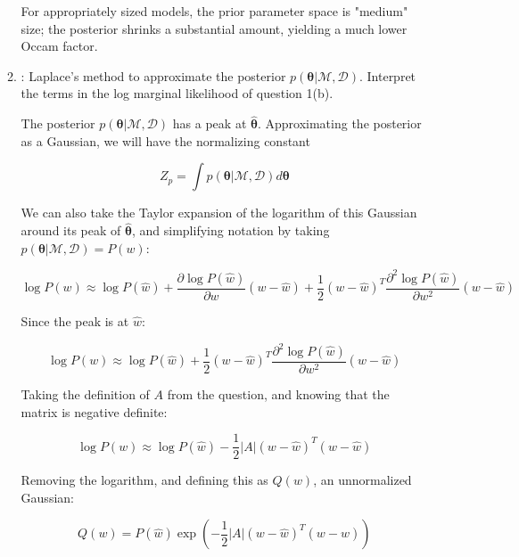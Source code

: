 \documentclass[11pt]{article}
\newcommand{\mbf}[1]{{\boldsymbol{\mathbf{#1}}}}
\renewcommand{\bm}{\mbf}
\begin{document}
\begin{enumerate}
\begin{enumerate}[label=(\alph*)]
            For appropriately sized models, the prior parameter space is "medium" size; the posterior shrinks a substantial amount, yielding a much lower Occam factor.

        \item: Laplace's method to approximate the posterior $p(\bm{\theta} | \mathcal{M}, \mathcal{D})$. Interpret the terms in the log marginal likelihood of question 1(b).





            The posterior $p(\bm{\theta}| \mathcal{M}, \mathcal{D})$ has a peak at $\bm{\hat{\theta}}$. Approximating the posterior as a Gaussian, we will have the normalizing constant

            $$
            Z_p = \int p(\bm{\theta} | \mathcal{M}, \mathcal{D}) d \bm{\theta}
            $$

            We can also take the Taylor expansion of the logarithm of this Gaussian around its peak of $\bm{\hat{\theta}}$, and simplifying notation by taking $p(\bm{\theta} | \mathcal{M}, \mathcal{D}) = P(w)$:

            $$
            \log P(w) \approx \log P(\hat{w}) + \dfrac{\partial \log P(\hat{w})}{\partial w} (w - \hat{w}) +  \dfrac{1}{2} (w - \hat{w})^T \dfrac{\partial^2 \log P(\hat{w})}{\partial w^2} (w - \hat{w})
            $$

            Since the peak is at $\hat{w}$:

            $$
            \log P(w) \approx \log P(\hat{w}) + \dfrac{1}{2} (w - \hat{w})^T \dfrac{\partial^2 \log P(\hat{w})}{\partial w^2} (w - \hat{w})
            $$

            Taking the definition of $A$ from the question, and knowing that the matrix is negative definite:

            $$
            \log P(w) \approx \log P(\hat{w}) - \dfrac{1}{2} |A| (w - \hat{w})^T (w - \hat{w})
            $$

            Removing the logarithm, and defining this as $Q(w)$, an unnormalized Gaussian:

            $$
            Q(w) = P(\hat{w}) \exp( - \dfrac{1}{2} |A|(w - \hat{w})^T (w - \hat{w}))
            $$


\end{enumerate}
\end{enumerate}
\end{document}
